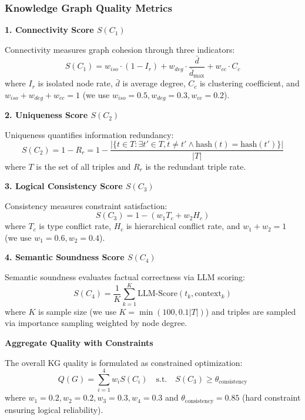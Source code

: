 \documentclass[runningheads]{llncs}
\begin{document}
\subsubsection{Knowledge Graph Quality Metrics}

\textbf{1. Connectivity Score $S(C_1)$}

Connectivity measures graph cohesion through three indicators:
\begin{equation}
S(C_1) = w_{iso} \cdot (1 - I_r) + w_{deg} \cdot \frac{\bar{d}}{\bar{d}_{\max}} + w_{cc} \cdot C_c
\end{equation}
where $I_r$ is isolated node rate, $\bar{d}$ is average degree, $C_c$ is clustering coefficient, and $w_{iso} + w_{deg} + w_{cc} = 1$ (we use $w_{iso}=0.5, w_{deg}=0.3, w_{cc}=0.2$).

\textbf{2. Uniqueness Score $S(C_2)$}

Uniqueness quantifies information redundancy:
\begin{equation}
S(C_2) = 1 - R_r = 1 - \frac{|\{t \in T : \exists t' \in T, t \neq t' \land \text{hash}(t) = \text{hash}(t')\}|}{|T|}
\end{equation}
where $T$ is the set of all triples and $R_r$ is the redundant triple rate.

\textbf{3. Logical Consistency Score $S(C_3)$}

Consistency measures constraint satisfaction:
\begin{equation}
S(C_3) = 1 - (w_1 T_c + w_2 H_c)
\end{equation}
where $T_c$ is type conflict rate, $H_c$ is hierarchical conflict rate, and $w_1 + w_2 = 1$ (we use $w_1=0.6, w_2=0.4$).

\textbf{4. Semantic Soundness Score $S(C_4)$}

Semantic soundness evaluates factual correctness via LLM scoring:
\begin{equation}
S(C_4) = \frac{1}{K} \sum_{k=1}^{K} \text{LLM-Score}(t_k, \text{context}_k)
\end{equation}
where $K$ is sample size (we use $K = \min(100, 0.1|T|)$) and triples are sampled via importance sampling weighted by node degree.

\textbf{Aggregate Quality with Constraints}

The overall KG quality is formulated as constrained optimization:
\begin{equation}
\label{eq:kg_quality}
Q(G) = \sum_{i=1}^{4} w_i S(C_i) \quad \text{s.t.} \quad S(C_3) \ge \theta_{\text{consistency}}
\end{equation}
where $w_1=0.2, w_2=0.2, w_3=0.3, w_4=0.3$ and $\theta_{\text{consistency}}=0.85$ (hard constraint ensuring logical reliability).
\end{document}
